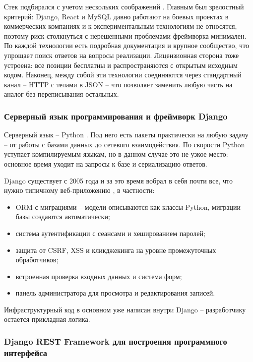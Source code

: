 Стек подбирался с учетом нескольких соображений \cite{orlov_se}. Главным был зрелостный критерий: Django, React и MySQL давно работают на боевых проектах в коммерческих компаниях и к экспериментальным технологиям не относятся, поэтому риск столкнуться с нерешенными проблемами фреймворка минимален. По каждой технологии есть подробная документация и крупное сообщество, что упрощает поиск ответов на вопросы реализации. Лицензионная сторона тоже устроена: все позиции бесплатны и распространяются с открытым исходным кодом. Наконец, между собой эти технологии соединяются через стандартный канал -- HTTP с телами в JSON -- что позволяет заменить любую часть на аналог без переписывания остальных.

\subsubsection{Серверный язык программирования и фреймворк Django}

Серверный язык -- Python \cite{lutz_python}. Под него есть пакеты практически на любую задачу -- от работы с базами данных до сетевого взаимодействия. По скорости Python уступает компилируемым языкам, но в данном случае это не узкое место: основное время уходит на запросы к базе и сериализацию ответов.

Django существует с 2005 года и за это время вобрал в себя почти все, что нужно типичному веб-приложению \cite{django_docs, art_python_web}, в частности:
\begin{itemize}
    \item ORM с миграциями -- модели описываются как классы Python, миграции базы создаются автоматически;
    \item система аутентификации с сеансами и хешированием паролей;
    \item защита от CSRF, XSS и кликджекинга на уровне промежуточных обработчиков;
    \item встроенная проверка входных данных и система форм;
    \item панель администратора для просмотра и редактирования записей.
\end{itemize}

Инфраструктурный код в основном уже написан внутри Django -- разработчику остается прикладная логика.

\subsubsection{Django REST Framework для построения программного интерфейса}

